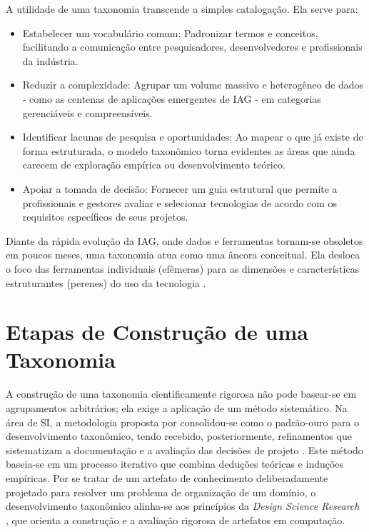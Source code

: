 A utilidade de uma taxonomia transcende a simples catalogação. Ela serve para:
\begin{itemize}
    \item Estabelecer um vocabulário comum: Padronizar termos e conceitos, facilitando a comunicação entre pesquisadores, desenvolvedores e profissionais da indústria.
    \item Reduzir a complexidade: Agrupar um volume massivo e heterogêneo de dados - como as centenas de aplicações emergentes de IAG - em categorias gerenciáveis e compreensíveis.
    \item Identificar lacunas de pesquisa e oportunidades: Ao mapear o que já existe de forma estruturada, o modelo taxonômico torna evidentes as áreas que ainda carecem de exploração empírica ou desenvolvimento teórico.
    \item Apoiar a tomada de decisão: Fornecer um guia estrutural que permite a profissionais e gestores avaliar e selecionar tecnologias de acordo com os requisitos específicos de seus projetos.
\end{itemize}

Diante da rápida evolução da IAG, onde dados e ferramentas tornam-se obsoletos em poucos meses, uma taxonomia atua como uma âncora conceitual. Ela desloca o foco das ferramentas individuais (efêmeras) para as dimensões e características estruturantes (perenes) do uso da tecnologia \citep{RothAleo2026}.

\section{Etapas de Construção de uma Taxonomia}
\label{sec:tax:etapas}

A construção de uma taxonomia cientificamente rigorosa não pode basear-se em agrupamentos arbitrários; ela exige a aplicação de um método sistemático. Na área de SI, a metodologia proposta por \citet{nickerson2013method} consolidou-se como o padrão-ouro para o desenvolvimento taxonômico, tendo recebido, posteriormente, refinamentos que sistematizam a documentação e a avaliação das decisões de projeto \citep{kundisch2022, szopinski2019}. Este método baseia-se em um processo iterativo que combina deduções teóricas e induções empíricas. Por se tratar de um artefato de conhecimento deliberadamente projetado para resolver um problema de organização de um domínio, o desenvolvimento taxonômico alinha-se aos princípios da \textit{Design Science Research} \citep{hevner2004}, que orienta a construção e a avaliação rigorosa de artefatos em computação.

